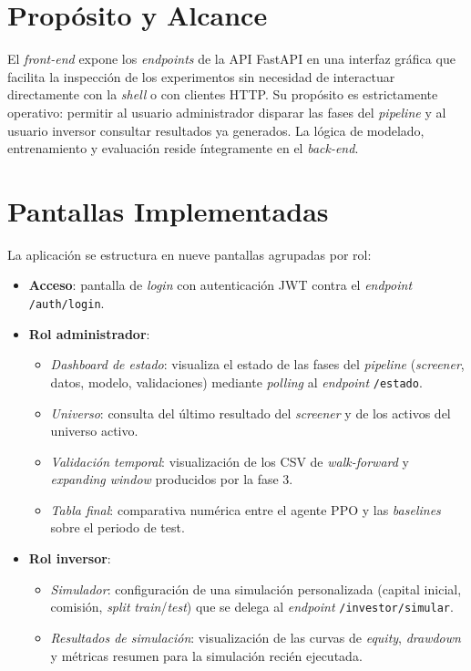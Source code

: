 \documentclass[IB,a4paper]{TFUOC}
\begin{document}
\section{Propósito y Alcance}

El \textit{front-end} expone los \textit{endpoints} de la API FastAPI en una interfaz gráfica que facilita la inspección de los experimentos sin necesidad de interactuar directamente con la \textit{shell} o con clientes HTTP. Su propósito es estrictamente operativo: permitir al usuario administrador disparar las fases del \textit{pipeline} y al usuario inversor consultar resultados ya generados. La lógica de modelado, entrenamiento y evaluación reside íntegramente en el \textit{back-end}.

\section{Pantallas Implementadas}

La aplicación se estructura en nueve pantallas agrupadas por rol:

\begin{itemize}
    \item \textbf{Acceso}: pantalla de \textit{login} con autenticación JWT contra el \textit{endpoint} \texttt{/auth/login}.
    \item \textbf{Rol administrador}:
    \begin{itemize}
        \item \textit{Dashboard de estado}: visualiza el estado de las fases del \textit{pipeline} (\textit{screener}, datos, modelo, validaciones) mediante \textit{polling} al \textit{endpoint} \texttt{/estado}.
        \item \textit{Universo}: consulta del último resultado del \textit{screener} y de los activos del universo activo.
        \item \textit{Validación temporal}: visualización de los CSV de \textit{walk-forward} y \textit{expanding window} producidos por la fase 3.
        \item \textit{Tabla final}: comparativa numérica entre el agente PPO y las \textit{baselines} sobre el periodo de test.
    \end{itemize}
    \item \textbf{Rol inversor}:
    \begin{itemize}
        \item \textit{Simulador}: configuración de una simulación personalizada (capital inicial, comisión, \textit{split} \textit{train}/\textit{test}) que se delega al \textit{endpoint} \texttt{/investor/simular}.
        \item \textit{Resultados de simulación}: visualización de las curvas de \textit{equity}, \textit{drawdown} y métricas resumen para la simulación recién ejecutada.
    \end{itemize}
\end{itemize}
\end{document}
